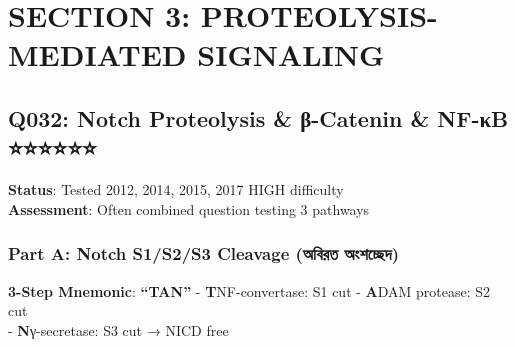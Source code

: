 \hypertarget{section-3-proteolysis-mediated-signaling}{%
\chapter{SECTION 3: PROTEOLYSIS-MEDIATED
SIGNALING}\label{section-3-proteolysis-mediated-signaling}}

\hypertarget{q032-notch-proteolysis-ux3b2-catenin-nf-ux3bab}{%
\section{Q032: Notch Proteolysis \& β-Catenin \& NF-κB
⭐⭐⭐⭐⭐⭐}\label{q032-notch-proteolysis-ux3b2-catenin-nf-ux3bab}}

\textbf{Status}: Tested 2012, 2014, 2015, 2017 \textbar{} HIGH
difficulty\\
\textbf{Assessment}: Often combined question testing 3 pathways

\hypertarget{part-a-notch-s1s2s3-cleavage-ux985ux9acux9b0ux9a4-ux985ux9b6ux99aux99bux9a6}{%
\subsection{\texorpdfstring{\textbf{Part A: Notch S1/S2/S3 Cleavage
(অবিরত
অংশচ্ছেদ)}}{Part A: Notch S1/S2/S3 Cleavage (অবিরত অংশচ্ছেদ)}}\label{part-a-notch-s1s2s3-cleavage-ux985ux9acux9b0ux9a4-ux985ux9b6ux99aux99bux9a6}}

\begin{Shaded}
\begin{Highlighting}[]
\end{Highlighting}
\end{Shaded}

\textbf{3-Step Mnemonic}: \textbf{``TAN''} - \textbf{T}NF-convertase: S1
cut - \textbf{A}DAM protease: S2 cut\\
- \textbf{N}γ-secretase: S3 cut → NICD free

